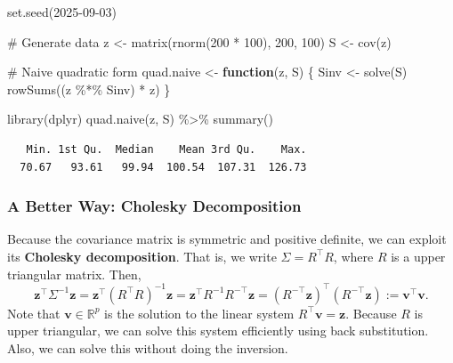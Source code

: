 \documentclass[
  letterpaper,
  DIV=11,
  numbers=noendperiod]{scrreprt}
\newenvironment{Shaded}{\begin{snugshade}}{\end{snugshade}}
\newcommand{\CommentTok}[1]{\textcolor[rgb]{0.37,0.37,0.37}{#1}}
\newcommand{\ControlFlowTok}[1]{\textcolor[rgb]{0.00,0.23,0.31}{\textbf{#1}}}
\newcommand{\DecValTok}[1]{\textcolor[rgb]{0.68,0.00,0.00}{#1}}
\newcommand{\FunctionTok}[1]{\textcolor[rgb]{0.28,0.35,0.67}{#1}}
\newcommand{\NormalTok}[1]{\textcolor[rgb]{0.00,0.23,0.31}{#1}}
\newcommand{\OtherTok}[1]{\textcolor[rgb]{0.00,0.23,0.31}{#1}}
\newcommand{\SpecialCharTok}[1]{\textcolor[rgb]{0.37,0.37,0.37}{#1}}
\begin{document}
\begin{Shaded}
\begin{Highlighting}[]
\FunctionTok{set.seed}\NormalTok{(}\DecValTok{2025{-}09{-}03}\NormalTok{)}

\CommentTok{\# Generate data}
\NormalTok{z }\OtherTok{\textless{}{-}} \FunctionTok{matrix}\NormalTok{(}\FunctionTok{rnorm}\NormalTok{(}\DecValTok{200} \SpecialCharTok{*} \DecValTok{100}\NormalTok{), }\DecValTok{200}\NormalTok{, }\DecValTok{100}\NormalTok{)}
\NormalTok{S }\OtherTok{\textless{}{-}} \FunctionTok{cov}\NormalTok{(z)}

\CommentTok{\# Naive quadratic form}
\NormalTok{quad.naive }\OtherTok{\textless{}{-}} \ControlFlowTok{function}\NormalTok{(z, S) \{}
\NormalTok{  Sinv }\OtherTok{\textless{}{-}} \FunctionTok{solve}\NormalTok{(S)}
  \FunctionTok{rowSums}\NormalTok{((z }\SpecialCharTok{\%*\%}\NormalTok{ Sinv) }\SpecialCharTok{*}\NormalTok{ z)}
\NormalTok{\}}

\FunctionTok{library}\NormalTok{(dplyr)}
\FunctionTok{quad.naive}\NormalTok{(z, S) }\SpecialCharTok{\%\textgreater{}\%} \FunctionTok{summary}\NormalTok{()}
\end{Highlighting}
\end{Shaded}

\begin{verbatim}
   Min. 1st Qu.  Median    Mean 3rd Qu.    Max. 
  70.67   93.61   99.94  100.54  107.31  126.73 
\end{verbatim}

\subsubsection{A Better Way: Cholesky
Decomposition}\label{a-better-way-cholesky-decomposition}

Because the covariance matrix \Sigma is symmetric and positive definite,
we can exploit its \textbf{Cholesky decomposition}. That is, we write
\(\Sigma = R^\top R\), where \(R\) is a upper triangular matrix. Then,
\[
\boldsymbol{z}^\top \Sigma^{-1} \boldsymbol{z}= \boldsymbol{z}^\top (R^\top R)^{-1} \boldsymbol{z}= \boldsymbol{z}^\top R^{-1}R^{-\top} \boldsymbol{z}= (R^{-\top}\boldsymbol{z})^\top (R^{-\top} \boldsymbol{z}) := \boldsymbol{v}^\top \boldsymbol{v}.
\] Note that \(\boldsymbol{v}\in \mathbb R^p\) is the solution to the
linear system \(R^\top \boldsymbol{v}= \boldsymbol{z}\). Because \(R\)
is upper triangular, we can solve this system efficiently using back
substitution. Also, we can solve this without doing the inversion.
\end{document}
